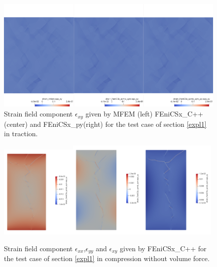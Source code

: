 \documentclass[12pt]{article}
\newcommand{\f}[1]{FEniCSx#1}
\newcommand{\tens}[1]{
	{\ensuremath{\mathsf{#1}}}
}
\begin{document}
\begin{figure}	
	\includegraphics[width=1.\textwidth]{strainxy.png}
	\caption{Strain  field component $\tens{\epsilon}_{xy}$ given by MFEM (left) \f{\_C++}(center) and \f{\_py}(right) for the test case of section \ref{expl1} in traction.\label{strainxy}}
\end{figure}
\begin{figure}	
	\includegraphics[width=0.33\textwidth]{strainxx_comp.png}\includegraphics[width=0.33\textwidth]{strainyy_comp.png}\includegraphics[width=0.33\textwidth]{strainxy_comp.png}
	\caption{Strain  field component $\tens{\epsilon}_{xx}$,$\tens{\epsilon}_{yy}$ and $\tens{\epsilon}_{xy}$ given by  \f{\_C++} for the test case of section \ref{expl1} in compression without volume force.\label{strain_comp}}
\end{figure}
\end{document}

